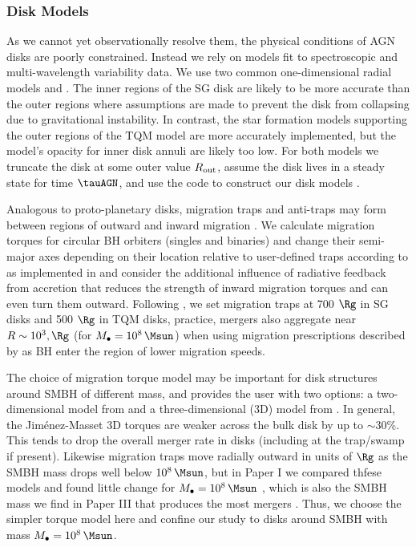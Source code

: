\subsubsection{Disk Models}
As we cannot yet observationally resolve them, the physical conditions of AGN disks are poorly constrained.
Instead we rely on models fit to spectroscopic and multi-wavelength variability data.
We use two common one-dimensional radial models \citet[][hereafter SG]{SirkoGoodman03} and \citet[][hereafter TQM]{ThompsonQuataertMurray05}.
The inner regions of the SG disk are likely to be more accurate than the outer regions where assumptions are made to prevent the disk from collapsing due to gravitational instability.
In contrast, the star formation models supporting the outer regions of the TQM model are more accurately implemented, but the model's opacity for inner disk annuli are likely too low.
For both models we truncate the disk at some outer value $R_{\rm out}$, assume the disk lives in a steady state for time $\tauAGN$, and use the  code to construct our disk models \citep{Gangardt+24-pAGN}.

Analogous to proto-planetary disks, migration traps and anti-traps may form between regions of outward and inward migration \citep{Lyra+10}.
We calculate migration torques for circular BH orbiters (singles and binaries) and change their semi-major axes depending on their location relative to user-defined traps according to \citet{Paardekooper+10} as implemented in \citet{GrishinGilbaumStone24} and consider the additional influence of radiative feedback from accretion \citep{HanklaJiangArmitage20} that reduces the strength of inward migration torques and can even turn them outward.
Following \citet{Bellovary+16}, we set migration traps at 700 $\Rg$ in SG disks and 500 $\Rg$ in TQM disks, practice, mergers also aggregate near $R\sim10^3,\Rg$ (for $M_\bullet = 10^8\,\Msun$) when using migration prescriptions described by \citet{GrishinGilbaumStone24} as BH enter the region of lower migration speeds.

The choice of migration torque model may be important for disk structures around SMBH of different mass, and  provides the user with two options: a two-dimensional model from \citet{Paardekooper+10} and a three-dimensional (3D) model from \citet{JimenezMassset17}.
In general, the Jim\'enez-Masset 3D torques are weaker across the bulk disk by up to $\sim$30\%.
This tends to drop the overall merger rate in disks (including at the trap/swamp if present).
Likewise migration traps move radially outward in units of $\Rg$ as the SMBH mass drops well below $10^8\,\Msun$, but in Paper I we compared thfese models and found little change for $M_\bullet = 10^8\,\Msun$ \citep[see Fig. 6 \& 7 of][]{McKernan+25-mcfactsI}, which is also the SMBH mass we find in Paper III that produces the most mergers \citep{Delfavero+24-McFACTS3}.
Thus, we choose the simpler \citet{Paardekooper+10} torque model here and confine our study to disks around SMBH with mass $M_\bullet = 10^8\,\Msun$.

